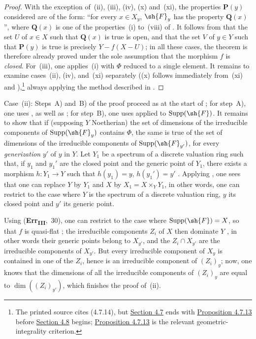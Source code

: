 \begin{proof}
With the exception of~(ii), (iii), (iv), (x) and~(xi), the properties $\mathbf{P}(y)$ considered are of the form: ``for every $x\in X_y$, $\sh{F}_y$ has the property $\mathbf{Q}(x)$'', where $\mathbf{Q}(x)$ is one of the properties~(i) to~(viii) of .
It follows from  that the set $U$ of $x\in X$ such that $\mathbf{Q}(x)$ is true is open, and that the set $V$ of $y\in Y$ such that $\mathbf{P}(y)$ is true is precisely $Y-f(X-U)$; in all these cases, the theorem is therefore already proved under the sole assumption that the morphism $f$ is \emph{closed}.
For~(iii), one applies~(i) with $\Phi$ reduced to a single element.
It remains to examine cases~(ii), (iv), and~(xi) separately ((x) follows immediately from~(xi) and ),\footnote{The printed source cites (4.7.14), but {\hyperlink{ega4.c04.subsec.4-7}{Section 4.7}} ends with {\hyperlink{ega4.c04.prop.4-7-13}{Proposition 4.7.13}} before {\hyperlink{ega4.c04.subsec.4-8}{Section 4.8}} begins; {\hyperlink{ega4.c04.prop.4-7-13}{Proposition 4.7.13}} is the relevant geometric-integrality criterion.} always applying the method described in .
\end{proof}

\begin{env}[12.2.1.1]
\label{IV.12.2.1.1}
Case~(ii): Steps~A) and~B) of the proof proceed as at the start of ; for step~A), one uses ,  as well as ; for step~B), one uses  applied to $\operatorname{Supp}(\sh{F})$.
It remains to show that if (supposing $Y$ Noetherian) the set of dimensions of the irreducible components of $\operatorname{Supp}(\sh{F}_y)$ contains $\Phi$, the same is true of the set of dimensions of the irreducible components of $\operatorname{Supp}(\sh{F}_{y'})$, for every \emph{generization} $y'$ of $y$ in $Y$.
Let $Y_1$ be a spectrum of a discrete valuation ring such that, if $y_1$ and $y_1'$ are the closed point and the generic point of $Y_1$, there exists a morphism $h:Y_1\to Y$ such that $h(y_1)=y$, $h(y_1')=y'$ .
Applying , one sees that one can replace $Y$ by $Y_1$ and $X$ by $X_1=X\times_Y Y_1$, in other words, one can restrict to the case where $Y$ is the spectrum of a discrete valuation ring, $y$ its closed point and $y'$ its generic point.

Using (\textbf{Err}\textsubscript{\textbf{III}},~30), one can restrict to the case where $\operatorname{Supp}(\sh{F})=X$, so that $f$ is quasi-flat ; the irreducible components $Z_i$ of $X$ then dominate $Y$ , in other words their generic points belong to $X_{y'}$, and the $Z_i\cap X_{y'}$ are the irreducible components of $X_{y'}$.
But every irreducible component of $X_y$ is contained in one of the $Z_i$, hence is an irreducible component of $(Z_i)_y$; now, one knows  that the dimensions of all the irreducible components of $(Z_i)_y$ are equal to $\dim((Z_i)_{y'})$, which finishes the proof of~(ii).
\end{env}

